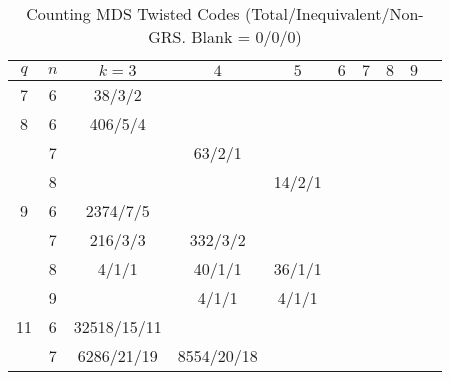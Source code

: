 \documentclass[conference,a4paper]{IEEEtran}
\begin{document}
{
\newcommand{\Count}[3]{#1$/$#2$/$#3}
\newcommand{\ZeroCount}{}

\begin{table}[b]
\caption{Counting MDS Twisted Codes (Total/Inequivalent/Non-GRS. Blank = 0/0/0)}
\label{tab:Search_Equivalence_Classes}
\centering
\renewcommand{\arraystretch}{1.2}
\setlength{\tabcolsep}{1pt}

\tiny
\begin{tabular}{@{}c|c||c|c|c|c|c|c|c|c@{}}
$q$ & $n$ & $k=3$                   & $4$                   & $5$                     & $6$                  & $7$                & $8$               & $9$ \\
\hline \hline
7
    & 6   & \Count{38}{3}{2}        &                       &                         &                      &                    &                   &     \\
\hline
8
    & 6   & \Count{406}{5}{4}       &                       &                         &                      &                    &                   &     \\
    & 7   & \ZeroCount              & \Count{63}{2}{1}      &                         &                      &                    &                   &     \\
    & 8   & \ZeroCount              & \ZeroCount            & \Count{14}{2}{1}        &                      &                    &                   &     \\
\hline
9
    & 6   & \Count{2374}{7}{5}      &                       &                         &                      &                    &                   &     \\
    & 7   & \Count{216}{3}{3}       & \Count{332}{3}{2}     &                         &                      &                    &                   &     \\
    & 8   & \Count{4}{1}{1}         & \Count{40}{1}{1}      & \Count{36}{1}{1}        &                      &                    &                   &     \\
    & 9   & \ZeroCount              & \Count{4}{1}{1}       & \Count{4}{1}{1}         & \ZeroCount           &                    &                   &     \\
\hline
11
    & 6   & \Count{32518}{15}{11}   &                       &                         &                      &                    &                   &     \\
    & 7   & \Count{6286}{21}{19}    & \Count{8554}{20}{18}  &                         &                      &                    &                   &     \\

\end{tabular}
\end{table}}
\end{document}
